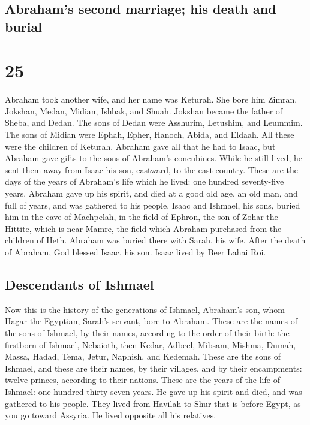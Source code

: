 \hypertarget{abrahams-second-marriage-his-death-and-burial}{%
\subsection{Abraham's second marriage; his death and
burial}\label{abrahams-second-marriage-his-death-and-burial}}

\hypertarget{section-24}{%
\section{25}\label{section-24}}

 Abraham took another wife, and her name was Keturah.
 She bore him Zimran, Jokshan, Medan, Midian, Ishbak, and
Shuah.  Jokshan became the father of Sheba, and Dedan. The
sons of Dedan were Asshurim, Letushim, and Leummim.  The
sons of Midian were Ephah, Epher, Hanoch, Abida, and Eldaah. All these
were the children of Keturah.  Abraham gave all that he
had to Isaac,  but Abraham gave gifts to the sons of
Abraham's concubines. While he still lived, he sent them away from Isaac
his son, eastward, to the east country.  These are the
days of the years of Abraham's life which he lived: one hundred
seventy-five years.  Abraham gave up his spirit, and died
at a good old age, an old man, and full of years, and was gathered to
his people.  Isaac and Ishmael, his sons, buried him in
the cave of Machpelah, in the field of Ephron, the son of Zohar the
Hittite, which is near Mamre,  the field which Abraham
purchased from the children of Heth. Abraham was buried there with
Sarah, his wife.  After the death of Abraham, God blessed
Isaac, his son. Isaac lived by Beer Lahai Roi.

\hypertarget{descendants-of-ishmael}{%
\subsection{Descendants of Ishmael}\label{descendants-of-ishmael}}

 Now this is the history of the generations of Ishmael,
Abraham's son, whom Hagar the Egyptian, Sarah's servant, bore to
Abraham.  These are the names of the sons of Ishmael, by
their names, according to the order of their birth: the firstborn of
Ishmael, Nebaioth, then Kedar, Adbeel, Mibsam,  Mishma,
Dumah, Massa,  Hadad, Tema, Jetur, Naphish, and Kedemah.
 These are the sons of Ishmael, and these are their
names, by their villages, and by their encampments: twelve princes,
according to their nations.  These are the years of the
life of Ishmael: one hundred thirty-seven years. He gave up his spirit
and died, and was gathered to his people.  They lived
from Havilah to Shur that is before Egypt, as you go toward Assyria. He
lived opposite all his relatives.

